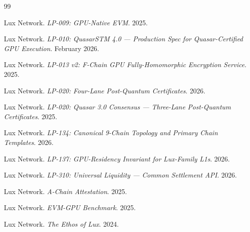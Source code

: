 \documentclass[11pt,a4paper]{article}
\begin{document}

\begin{thebibliography}{99}

 Lux Network. \emph{LP-009: GPU-Native EVM}. 2025.

 Lux Network. \emph{LP-010: QuasarSTM 4.0 --- Production Spec for Quasar-Certified GPU Execution}. February 2026.

 Lux Network. \emph{LP-013 v2: F-Chain GPU Fully-Homomorphic Encryption Service}. 2025.

 Lux Network. \emph{LP-020: Four-Lane Post-Quantum Certificates}. 2026.

 Lux Network. \emph{LP-020: Quasar 3.0 Consensus --- Three-Lane Post-Quantum Certificates}. 2025.

 Lux Network. \emph{LP-134: Canonical 9-Chain Topology and Primary Chain Templates}. 2026.

 Lux Network. \emph{LP-137: GPU-Residency Invariant for Lux-Family L1s}. 2026.

 Lux Network. \emph{LP-310: Universal Liquidity --- Common Settlement API}. 2026.

 Lux Network. \emph{A-Chain Attestation}. 2025.

 Lux Network. \emph{EVM-GPU Benchmark}. 2025.

 Lux Network. \emph{The Ethos of Lux}. 2024.

\end{thebibliography}
\end{document}
